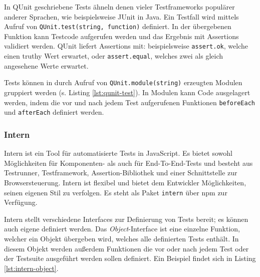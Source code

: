 In QUnit geschriebene Tests ähneln denen vieler Testframeworks populärer anderer Sprachen, wie beispielsweise JUnit in Java. Ein Testfall wird mittels Aufruf von \texttt{QUnit.test(string, function)} definiert. In der übergebenen Funktion kann Testcode aufgerufen werden und das Ergebnis mit Assertions validiert werden. QUnit liefert Assertions mit: beispielsweise \texttt{assert.ok}, welche einen truthy Wert erwartet, oder \texttt{assert.equal}, welches zwei als gleich angesehene Werte erwartet. \cite{qunit-cookbook}

Tests können in durch Aufruf von \texttt{QUnit.module(string)} erzeugten Modulen gruppiert werden (s. Listing \ref{lst:qunit-test}). In Modulen kann Code ausgelagert werden, indem die vor und nach jedem Test aufgerufenen Funktionen \texttt{beforeEach} und \texttt{afterEach} definiert werden. \cite{qunit-cookbook}

\begin{figure}[H]
	
\end{figure}

\subsubsection{Intern}
\label{sec:Intern}
Intern ist ein Tool für automatisierte Tests in JavaScript. Es bietet sowohl Möglichkeiten für Komponenten- als auch für End-To-End-Tests und besteht aus Testrunner, Testframework, Assertion-Bibliothek und einer Schnittstelle zur Browsersteuerung. Intern ist flexibel und bietet dem Entwickler Möglichkeiten, seinen eigenen Stil zu verfolgen. Es steht als Paket \texttt{intern} über npm zur Verfügung. \cite{intern-userguide}

Intern stellt verschiedene Interfaces zur Definierung von Tests bereit; es können auch eigene definiert werden. Das \textit{Object}-Interface ist eine einzelne Funktion, welcher ein Objekt übergeben wird, welches alle definierten Tests enthält. In diesem Objekt werden außerdem Funktionen die vor oder nach jedem Test oder der Testsuite ausgeführt werden sollen definiert. Ein Beispiel findet sich in Listing \ref{lst:intern-object}. \cite{intern-userguide}

\begin{figure}[H]
	
\end{figure}

